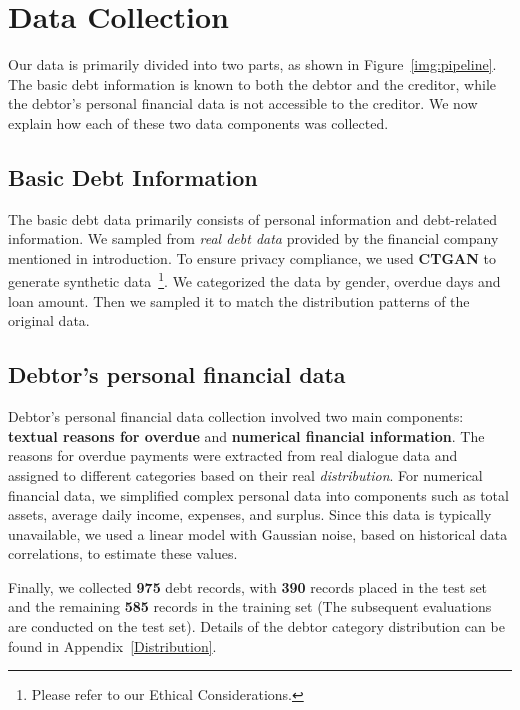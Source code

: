 \section{Data Collection}\label{sec:data}

Our data is primarily divided into two parts, as shown in Figure~\ref{img:pipeline}. The basic debt information is known to both the debtor and the creditor, while the debtor’s personal financial data is not accessible to the creditor. We now explain how each of these two data components was collected.

\subsection{Basic Debt Information}

The basic debt data primarily consists of personal information and debt-related information. We sampled from \textit{real debt data} provided by the financial company mentioned in introduction. To ensure privacy compliance, we used \textbf{CTGAN} \citep{ctgan} to generate synthetic data~\footnote{Please refer to our Ethical Considerations.}. We categorized the data by gender, overdue days and loan amount. Then we sampled it to match the distribution patterns of the original data. 

\subsection{Debtor’s personal financial data}

Debtor’s personal financial data collection involved two main components: \textbf{textual reasons for overdue} and \textbf{numerical financial information}. The reasons for overdue payments were extracted from real dialogue data and assigned to different categories based on their real \textit{distribution}. For numerical financial data, we simplified complex personal data into components such as total assets, average daily income, expenses, and surplus. Since this data is typically unavailable, we used a linear model with Gaussian noise, based on historical data correlations, to estimate these values. 

Finally, we collected \textbf{975} debt records, with \textbf{390} records placed in the test set and the remaining \textbf{585} records in the training set (The subsequent evaluations are conducted on the test set). Details of the debtor category distribution can be found in Appendix~\ref{Distribution}.





